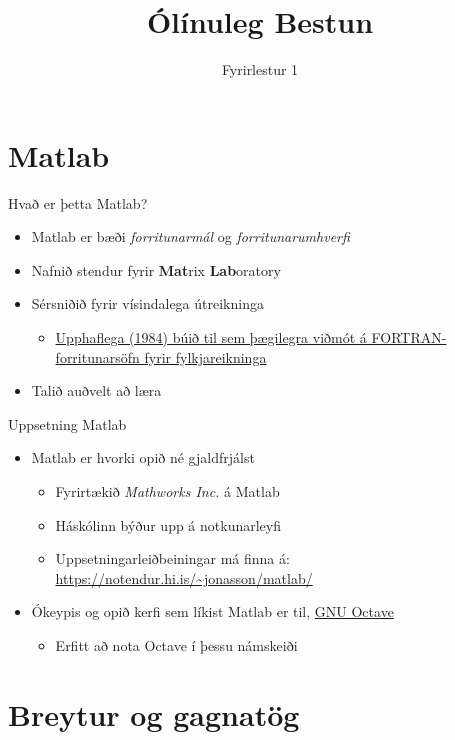 \documentclass{beamer}
\title{Ólínuleg Bestun}
\subtitle{Fyrirlestur 1}
\begin{document}
\begin{frame}
\titlepage
\end{frame}

\section{Matlab}

\begin{frame}{Hvað er þetta Matlab?}
\begin{itemize}
    \item Matlab er bæði \emph{forritunarmál} og \emph{forritunarumhverfi}
    \item Nafnið stendur fyrir \textbf{Mat}rix \textbf{Lab}oratory
    \item Sérsniðið fyrir vísindalega útreikninga
    \begin{itemize}
        \item \href{http://se.mathworks.com/company/newsletters/articles/the-origins-of-matlab.html}{Upphaflega (1984) búið til sem þægilegra viðmót á FORTRAN-forritunarsöfn fyrir fylkjareikninga}
    \end{itemize}
    \item Talið auðvelt að læra
\end{itemize}
\end{frame}

\begin{frame}{Uppsetning Matlab}
    \begin{itemize}
    \item Matlab er hvorki opið né gjaldfrjálst
    \begin{itemize}
        \item Fyrirtækið \emph{Mathworks Inc.} á Matlab
        \item Háskólinn býður upp á notkunarleyfi
        \item Uppsetningarleiðbeiningar má finna á: \url{https://notendur.hi.is/\~jonasson/matlab/}
    \end{itemize}
        \item Ókeypis og opið kerfi sem líkist Matlab er til, \href{https://www.gnu.org/software/octave/}{GNU Octave}
        \begin{itemize}
            \item Erfitt að nota Octave í þessu námskeiði
        \end{itemize}
    \end{itemize}
\end{frame}

\section{Breytur og gagnatög}
\end{document}

